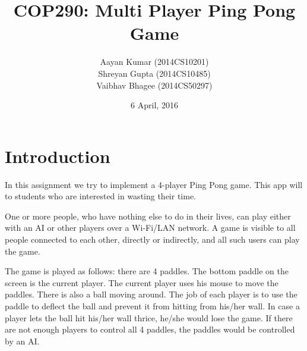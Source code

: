 \documentclass{article}
\title{COP290: Multi Player Ping Pong Game}
\author{Aayan Kumar (2014CS10201) \\ Shreyan Gupta (2014CS10485) \\ Vaibhav Bhagee (2014CS50297) }
\date{6 April, 2016}
\begin{document}
\maketitle
 
\tableofcontents
\newpage
\section{Introduction}
    \par
    In this assignment we try to implement a 4-player Ping Pong game. This app will to students who are interested in wasting their time.
    \par 
    One or more people, who have nothing else to do in their lives, can play either with an AI or other players over a Wi-Fi/LAN network. A game is visible to all people connected to each other, directly or indirectly, and all such users can play the game.
    \par
    The game is played as follows: there are 4 paddles. The bottom paddle on the screen is the current player. The current player uses his mouse to move the paddles. There is also a ball moving around. The job of each player is to use the paddle to deflect the ball and prevent it from hitting from his/her wall. In case a player lets the ball hit his/her wall thrice, he/she would lose the game. If there are not enough players to control all 4 paddles, the paddles would be controlled by an AI.
    
\end{document}
